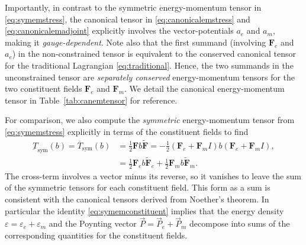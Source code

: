 \documentclass[1p,sort&compress]{elsarticle}
\numberwithin{equation}{section}
\newcommand{\rv}[1]{\vec{#1}}
\newcommand{\bv}[1]{\mathbf{#1}}
\begin{document}
Importantly, in contrast to the symmetric energy-momentum tensor in \eqref{eq:symemstress}, the canonical tensor in \eqref{eq:canonicalemstress} and \eqref{eq:canonicalemadjoint} explicitly involves the vector-potentials $a_e$ and $a_m$, making it \emph{gauge-dependent}. Note also that the first summand (involving $\bv{F}_e$ and $a_e$) in the non-constrained tensor is equivalent to the conserved canonical tensor for the traditional Lagrangian \eqref{eq:traditional}. Hence, the two summands in the unconstrained tensor are \emph{separately conserved} energy-momentum tensors for the two constituent fields $\bv{F}_e$ and $\bv{F}_m$.  We detail the canonical energy-momentum tensor in Table~\ref{tab:canemtensor} for reference.

For comparison, we also compute the \emph{symmetric} energy-momentum tensor from \eqref{eq:symemstress} explicitly in terms of the constituent fields to find
\begin{align}\label{eq:symemconstituent}
  \underbar{T}_{\text{sym}}(b) = \overline{T}_{\text{sym}}(b) &= \frac{1}{2}\bv{F}b\widetilde{\bv{F}} = -\frac{1}{2}(\bv{F}_e + \bv{F}_m I)b(\bv{F}_e + \bv{F}_m I), \\
  &= \frac{1}{2}\bv{F}_eb\widetilde{\bv{F}}_e + \frac{1}{2}\bv{F}_mb\widetilde{\bv{F}}_m. \nonumber
\end{align}
The cross-term involves a vector minus its reverse, so it vanishes to leave the sum of the symmetric tensors for each constituent field.  This form as a sum is consistent with the canonical tensors derived from Noether's theorem.  In particular the identity \eqref{eq:symemconstituent} implies that the energy density $\varepsilon = \varepsilon_e + \varepsilon_m$ and the Poynting vector $\rv{P} = \rv{P}_e + \rv{P}_m$ decompose into sums of the corresponding quantities for the constituent fields. 
\end{document}

